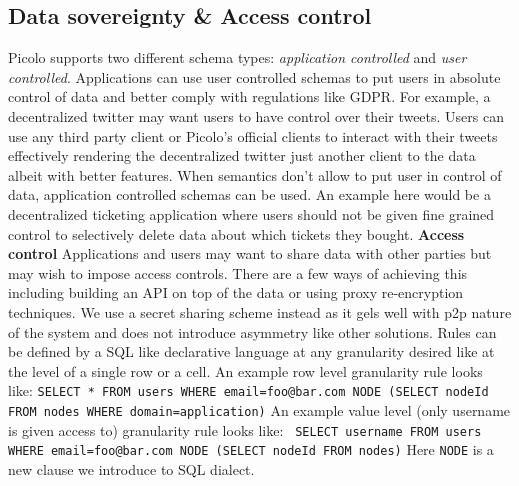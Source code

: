 \subsection{Data sovereignty \& Access control} \label{sec:access_control}
Picolo supports two different schema types: \textit{application controlled} and \textit{user controlled}. Applications can use user controlled schemas to put users in absolute control of data and better comply with regulations like GDPR. For example, a decentralized twitter may  want users to have control over their tweets. Users can use any third party client or Picolo's official clients to interact with their tweets effectively rendering the decentralized twitter just another client to the data albeit with better features. \newline\newline
When semantics don't allow to put user in control of data, application controlled schemas can be used. An example here would be a decentralized ticketing application where users should not be given fine grained control to selectively delete data about which tickets they bought.
\newline\newline
\textbf{Access control} 
Applications and users may want to share data with other parties but may wish to impose access controls. There are a few ways of achieving this including building an API on top of the data or using proxy re-encryption techniques. We use a secret sharing scheme instead as it gels well with p2p nature of the system and does not introduce asymmetry like other solutions. Rules can be defined by a SQL like declarative language at any granularity desired like at the level of a single row or a cell. An example row level granularity rule looks like:\newline \newline
\texttt{SELECT  * \newline FROM users \newline WHERE email=foo@bar.com \newline NODE (SELECT nodeId FROM nodes WHERE domain=application)} \newline \newline
An example value level (only username is given access to) granularity rule looks like:\newline \newline
\texttt{ SELECT username \newline FROM users \newline WHERE email=foo@bar.com \newline NODE (SELECT nodeId FROM nodes)}\newline\newline
Here \texttt{NODE} is a new clause we introduce to SQL dialect.


